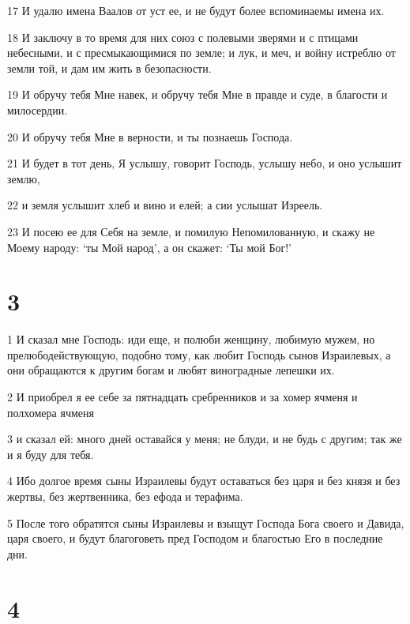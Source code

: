 \par 17 И удалю имена Ваалов от уст ее, и не будут более вспоминаемы имена их.
\par 18 И заключу в то время для них союз с полевыми зверями и с птицами небесными, и с пресмыкающимися по земле; и лук, и меч, и войну истреблю от земли той, и дам им жить в безопасности.
\par 19 И обручу тебя Мне навек, и обручу тебя Мне в правде и суде, в благости и милосердии.
\par 20 И обручу тебя Мне в верности, и ты познаешь Господа.
\par 21 И будет в тот день, Я услышу, говорит Господь, услышу небо, и оно услышит землю,
\par 22 и земля услышит хлеб и вино и елей; а сии услышат Изреель.
\par 23 И посею ее для Себя на земле, и помилую Непомилованную, и скажу не Моему народу: `ты Мой народ', а он скажет: `Ты мой Бог!'

\chapter{3}

\par 1 И сказал мне Господь: иди еще, и полюби женщину, любимую мужем, но прелюбодействующую, подобно тому, как любит Господь сынов Израилевых, а они обращаются к другим богам и любят виноградные лепешки их.
\par 2 И приобрел я ее себе за пятнадцать сребренников и за хомер ячменя и полхомера ячменя
\par 3 и сказал ей: много дней оставайся у меня; не блуди, и не будь с другим; так же и я буду для тебя.
\par 4 Ибо долгое время сыны Израилевы будут оставаться без царя и без князя и без жертвы, без жертвенника, без ефода и терафима.
\par 5 После того обратятся сыны Израилевы и взыщут Господа Бога своего и Давида, царя своего, и будут благоговеть пред Господом и благостью Его в последние дни.

\chapter{4}

